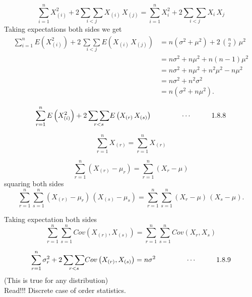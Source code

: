 \documentclass[12pt,a4paper]{report}
\theoremstyle{definition}
\theoremstyle{plain}
\begin{document}
$$\sum^n_{i = 1} X_{(i)}^2 + 2\underset{i < j}{\sum\sum} X_{(i)} \, X_{(j)} = \sum^n_{i = 1} X_i^2 + 2\underset{i<j}{\sum\sum}X_i\, X_j$$
Taking expectations both sides we get
\begin{align*}
\sum^n_{i = 1} E\left(X^2_{(i)}\right)  + 2\, \underset{i< j}{\sum\sum}E\left(X_{(i)}\, X_{(j)}\right) & = n(\sigma^2 + \mu^2) + 2\, \binom{n}{2}\, \mu^2\\
&  = n\sigma^2 + n\mu^2 + n(n - 1)\mu^2\\
& = n\sigma^2 + n\mu^2 + n^2\mu^2 - n\mu^2\\
& = n\sigma^2 + n^2\sigma^2\\
& = n(\sigma^2 + n\mu^2).
\end{align*}


$$\sum^n_{r = 1} E\left(X_{(i)}^2\right) + 2\, \underset{r<s}{\sum\sum}E\left(X_{(r)}\, X_{(s)}\right)\hspace{1.5cm} \cdots\hspace{1cm} 1.8.8$$

$$\sum^n_{r = 1} X_{(r)} = \sum^n_{r = 1} X_{(r)}$$

$$\sum^n_{r = 1} \left(X_{(r)} - \mu_r\right) = \sum^n_{r = 1} (X_r   - \mu)$$
squaring both sides
$$\sum^n_{r = 1}\sum^n_{s = 1}\left(X_{(r)} - \mu_r\right)\,\left(X_{(s)} - \mu_s\right) = \sum^n_{r = 1}\sum^n_{s = 1}\left(X_r - \mu\right)\, \left(X_s - \mu\right).$$

Taking expectation both sides
$$\sum^n_{r  =1}\sum^{n}_{s = 1}Cov\left(X_{(r)},X_{(s)}\right) = \sum^n_{r = 1}\sum^n_{s = 1} Cov\left(X_r, X_s\right)$$

$$\sum^n_{r = 1}\sigma^2_r + 2\, \underset{r<s}{\sum\sum}Cov\left(X_{(r)}, X_{(s)}\right) = n\sigma^2\hspace{1.5cm} \cdots\hspace{1cm}1.8.9$$ (This is true for any distribution)\\

Read!!! Discrete case of order statistics.\\
\end{document}
